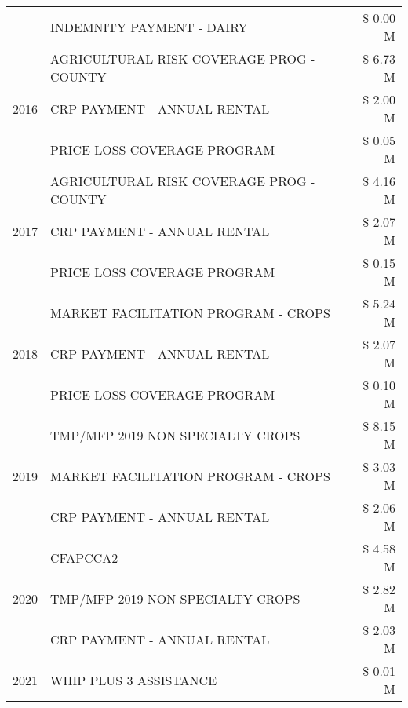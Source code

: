 \begin{tabular}{llr}
 & INDEMNITY PAYMENT - DAIRY & \$ 0.00 M \\
\cline{1-3}
\multirow[t]{3}{*}{2016} & AGRICULTURAL RISK COVERAGE PROG - COUNTY      & \$ 6.73 M \\
 & CRP PAYMENT - ANNUAL RENTAL                   & \$ 2.00 M \\
 & PRICE LOSS COVERAGE PROGRAM                   & \$ 0.05 M \\
\cline{1-3}
\multirow[t]{3}{*}{2017} & AGRICULTURAL RISK COVERAGE PROG - COUNTY & \$ 4.16 M \\
 & CRP PAYMENT - ANNUAL RENTAL & \$ 2.07 M \\
 & PRICE LOSS COVERAGE PROGRAM & \$ 0.15 M \\
\cline{1-3}
\multirow[t]{3}{*}{2018} & MARKET FACILITATION PROGRAM - CROPS & \$ 5.24 M \\
 & CRP PAYMENT - ANNUAL RENTAL & \$ 2.07 M \\
 & PRICE LOSS COVERAGE PROGRAM & \$ 0.10 M \\
\cline{1-3}
\multirow[t]{3}{*}{2019} & TMP/MFP 2019 NON SPECIALTY CROPS & \$ 8.15 M \\
 & MARKET FACILITATION PROGRAM - CROPS & \$ 3.03 M \\
 & CRP PAYMENT - ANNUAL RENTAL & \$ 2.06 M \\
\cline{1-3}
\multirow[t]{3}{*}{2020} & CFAPCCA2 & \$ 4.58 M \\
 & TMP/MFP 2019 NON SPECIALTY CROPS & \$ 2.82 M \\
 & CRP PAYMENT - ANNUAL RENTAL & \$ 2.03 M \\
\cline{1-3}
2021 & WHIP PLUS 3 ASSISTANCE & \$ 0.01 M \\
\cline{1-3}
\bottomrule
\end{tabular}
